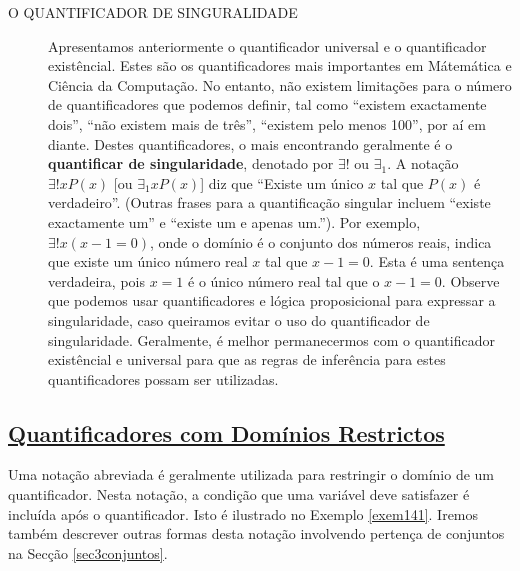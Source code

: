 \begin{description}
\item[O QUANTIFICADOR DE SINGURALIDADE] Apresentamos anteriormente o
quantificador universal e o quantificador existêncial. Estes são os
quantificadores mais importantes em Mátemática e Ciência da Computação. No
entanto, não existem limitações para o número de quantificadores que podemos
definir, tal como ``existem exactamente dois'', ``não existem mais de três'',
``existem pelo menos 100'', por aí em diante. Destes quantificadores, o mais
encontrando geralmente é o \textbf{quantificar de singularidade}, denotado por
$\exists!$ ou $\exists_1$. A notação $\exists!xP(x)$ [ou $\exists_1xP(x)$] diz
que ``Existe um único $x$ tal que $P(x)$ é verdadeiro''. (Outras frases para a
quantificação singular incluem ``existe exactamente um'' e ``existe um e apenas
um.''). Por exemplo, $\exists!x(x-1=0)$, onde o domínio é o conjunto dos números
reais, indica que existe um único número real $x$ tal que $x-1=0$. Esta é uma
sentença verdadeira, pois $x=1$ é o único número real tal que o $x-1=0$. Observe
que podemos usar quantificadores e lógica proposicional para expressar a
singularidade, caso queiramos evitar o uso do quantificador de singularidade.
Geralmente, é melhor permanecermos com o quantificador existêncial e universal
para que as regras de inferência para estes quantificadores possam ser
utilizadas.
\end{description}


\subsection*{\underline{Quantificadores com Domínios
Restrictos}}

Uma notação abreviada é geralmente utilizada para restringir o domínio de um
quantificador. Nesta notação, a condição que uma variável deve satisfazer é
incluída após o quantificador. Isto é ilustrado no Exemplo \ref{exem141}. Iremos
também descrever outras formas desta notação involvendo pertença de conjuntos na
Secção \ref{sec3conjuntos}.

